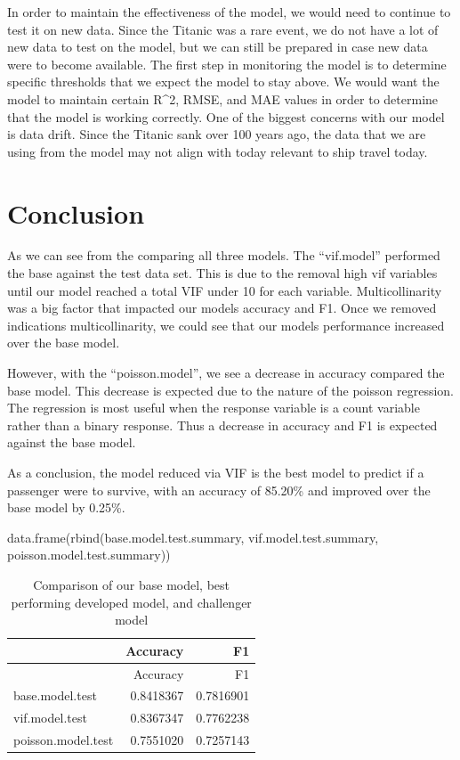 \documentclass[
  letterpaper,
  DIV=11,
  numbers=noendperiod]{scrartcl}
\newenvironment{Shaded}{\begin{snugshade}}{\end{snugshade}}
\newcommand{\FunctionTok}[1]{\textcolor[rgb]{0.28,0.35,0.67}{#1}}
\newcommand{\NormalTok}[1]{\textcolor[rgb]{0.00,0.23,0.31}{#1}}
\begin{document}
In order to maintain the effectiveness of the model, we would need to
continue to test it on new data. Since the Titanic was a rare event, we
do not have a lot of new data to test on the model, but we can still be
prepared in case new data were to become available. The first step in
monitoring the model is to determine specific thresholds that we expect
the model to stay above. We would want the model to maintain certain
R\^{}2, RMSE, and MAE values in order to determine that the model is
working correctly. One of the biggest concerns with our model is data
drift. Since the Titanic sank over 100 years ago, the data that we are
using from the model may not align with today relevant to ship travel
today.

\section{Conclusion}\label{conclusion}

As we can see from the comparing all three models. The ``vif.model''
performed the base against the test data set. This is due to the removal
high vif variables until our model reached a total VIF under 10 for each
variable. Multicollinarity was a big factor that impacted our models
accuracy and F1. Once we removed indications multicollinarity, we could
see that our models performance increased over the base model.

However, with the ``poisson.model'', we see a decrease in accuracy
compared the base model. This decrease is expected due to the nature of
the poisson regression. The regression is most useful when the response
variable is a count variable rather than a binary response. Thus a
decrease in accuracy and F1 is expected against the base model.

As a conclusion, the model reduced via VIF is the best model to predict
if a passenger were to survive, with an accuracy of 85.20\% and improved
over the base model by 0.25\%.

\begin{Shaded}
\begin{Highlighting}[]
\FunctionTok{data.frame}\NormalTok{(}\FunctionTok{rbind}\NormalTok{(base.model.test.summary, }
\NormalTok{                 vif.model.test.summary,}
\NormalTok{                 poisson.model.test.summary))}
\end{Highlighting}
\end{Shaded}

\begin{longtable}[]{@{}lrr@{}}
\caption{Comparison of our base model, best performing developed model,
and challenger model}\tabularnewline
\toprule\noalign{}
& Accuracy & F1 \\
\midrule\noalign{}
\endfirsthead
\toprule\noalign{}
& Accuracy & F1 \\
\midrule\noalign{}
\endhead
\bottomrule\noalign{}
\endlastfoot
base.model.test & 0.8418367 & 0.7816901 \\
vif.model.test & 0.8367347 & 0.7762238 \\
poisson.model.test & 0.7551020 & 0.7257143 \\
\end{longtable}
\end{document}
